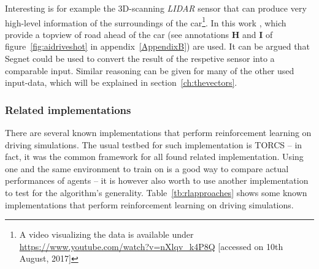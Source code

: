 Interesting is for example the 3D-scanning \textit{LIDAR} sensor that can produce very high-level information of the surroundings of the car\footnote{A video visualizing the data is available under \url{https://www.youtube.com/watch?v=nXlqv_k4P8Q} [accessed on 10th August, 2017]}. In this work , which provide a topview of road ahead of the car (see annotations \textbf{H} and \textbf{I} of figure~\ref{fig:aidriveshot} in appendix~\ref{AppendixB}) are used. It can be argued that Segnet\cite{badrinarayanan_segnet:_2015} could be used to convert the result of the respetive sensor into a comparable input. Similar reasoning can be given for many of the other used input-data, which will be explained in section~\ref{ch:thevectors}.


\subsubsection{Related implementations}

\label{sec:relatedimplements}

There are several known implementations that perform reinforcement learning on driving simulations. The usual testbed for such implementation is TORCS -- in fact, it was the common framework for all found related implementation. Using one and the same environment to train on is a good way to compare actual performances of agents -- it is however also worth to use another implementation to test for the algorithm's generality. Table~\ref{tb:rlapproaches} shows some known implementations that perform reinforcement learning on driving simulations. 

